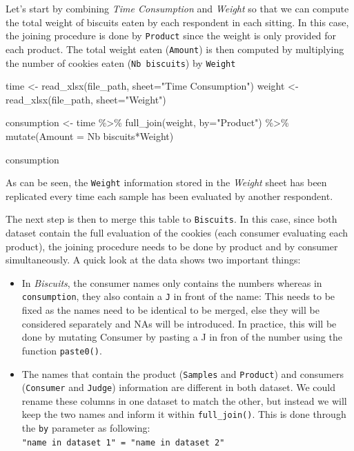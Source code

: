 \documentclass[
]{book}
\newenvironment{Shaded}{\begin{snugshade}}{\end{snugshade}}
\newcommand{\AttributeTok}[1]{\textcolor[rgb]{0.77,0.63,0.00}{#1}}
\newcommand{\FunctionTok}[1]{\textcolor[rgb]{0.00,0.00,0.00}{#1}}
\newcommand{\NormalTok}[1]{#1}
\newcommand{\OtherTok}[1]{\textcolor[rgb]{0.56,0.35,0.01}{#1}}
\newcommand{\SpecialCharTok}[1]{\textcolor[rgb]{0.00,0.00,0.00}{#1}}
\newcommand{\StringTok}[1]{\textcolor[rgb]{0.31,0.60,0.02}{#1}}
\providecommand{\tightlist}{%
  \setlength{\itemsep}{0pt}\setlength{\parskip}{0pt}}
\begin{document}
Let's start by combining \emph{Time Consumption} and \emph{Weight} so that we can compute the total weight of biscuits eaten by each respondent in each sitting. In this case, the joining procedure is done by \texttt{Product} since the weight is only provided for each product. The total weight eaten (\texttt{Amount}) is then computed by multiplying the number of cookies eaten (\texttt{Nb\ biscuits}) by \texttt{Weight}

\begin{Shaded}
\begin{Highlighting}[]
\NormalTok{time }\OtherTok{\textless{}{-}} \FunctionTok{read\_xlsx}\NormalTok{(file\_path, }\AttributeTok{sheet=}\StringTok{"Time Consumption"}\NormalTok{)}
\NormalTok{weight }\OtherTok{\textless{}{-}} \FunctionTok{read\_xlsx}\NormalTok{(file\_path, }\AttributeTok{sheet=}\StringTok{"Weight"}\NormalTok{)}

\NormalTok{consumption }\OtherTok{\textless{}{-}}\NormalTok{ time }\SpecialCharTok{\%\textgreater{}\%} 
  \FunctionTok{full\_join}\NormalTok{(weight, }\AttributeTok{by=}\StringTok{"Product"}\NormalTok{) }\SpecialCharTok{\%\textgreater{}\%} 
  \FunctionTok{mutate}\NormalTok{(}\AttributeTok{Amount =} \StringTok{\textasciigrave{}}\AttributeTok{Nb biscuits}\StringTok{\textasciigrave{}}\SpecialCharTok{*}\NormalTok{Weight)}

\NormalTok{consumption}
\end{Highlighting}
\end{Shaded}

As can be seen, the \texttt{Weight} information stored in the \emph{Weight} sheet has been replicated every time each sample has been evaluated by another respondent.

The next step is then to merge this table to \texttt{Biscuits}. In this case, since both dataset contain the full evaluation of the cookies (each consumer evaluating each product), the joining procedure needs to be done by product and by consumer simultaneously. A quick look at the data shows two important things:

\begin{itemize}
\tightlist
\item
  In \emph{Biscuits}, the consumer names only contains the numbers whereas in \texttt{consumption}, they also contain a \texttt{J} in front of the name: This needs to be fixed as the names need to be identical to be merged, else they will be considered separately and NAs will be introduced. In practice, this will be done by mutating Consumer by pasting a J in fron of the number using the function \texttt{paste0()}.
\item
  The names that contain the product (\texttt{Samples} and \texttt{Product}) and consumers (\texttt{Consumer} and \texttt{Judge}) information are different in both dataset. We could rename these columns in one dataset to match the other, but instead we will keep the two names and inform it within \texttt{full\_join()}. This is done through the \texttt{by} parameter as following: \texttt{"name\ in\ dataset\ 1"\ =\ "name\ in\ dataset\ 2"}
\end{itemize}
\end{document}
